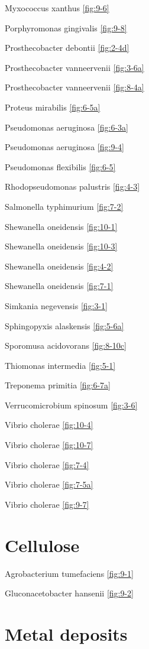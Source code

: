 \documentclass[]{tufte-book}
\begin{document}
Myxococcus xanthus \ref{fig:9-6}

Porphyromonas gingivalis \ref{fig:9-8}

Prosthecobacter debontii \ref{fig:2-4d}

Prosthecobacter vanneervenii \ref{fig:3-6a}

Prosthecobacter vanneervenii \ref{fig:8-4a}

Proteus mirabilis \ref{fig:6-5a}

Pseudomonas aeruginosa \ref{fig:6-3a}

Pseudomonas aeruginosa \ref{fig:9-4}

Pseudomonas flexibilis \ref{fig:6-5}

Rhodopseudomonas palustris \ref{fig:4-3}

Salmonella typhimurium \ref{fig:7-2}

Shewanella oneidensis \ref{fig:10-1}

Shewanella oneidensis \ref{fig:10-3}

Shewanella oneidensis \ref{fig:4-2}

Shewanella oneidensis \ref{fig:7-1}

Simkania negevensis \ref{fig:3-1}

Sphingopyxis alaskensis \ref{fig:5-6a}

Sporomusa acidovorans \ref{fig:8-10c}

Thiomonas intermedia \ref{fig:5-1}

Treponema primitia \ref{fig:6-7a}

Verrucomicrobium spinosum \ref{fig:3-6}

Vibrio cholerae \ref{fig:10-4}

Vibrio cholerae \ref{fig:10-7}

Vibrio cholerae \ref{fig:7-4}

Vibrio cholerae \ref{fig:7-5a}

Vibrio cholerae \ref{fig:9-7}

\hypertarget{cellulose-1}{%
\section*{Cellulose}\label{cellulose-1}}

Agrobacterium tumefaciens \ref{fig:9-1}

Gluconacetobacter hansenii \ref{fig:9-2}

\hypertarget{metal-deposits}{%
\section*{Metal deposits}\label{metal-deposits}}
\end{document}
